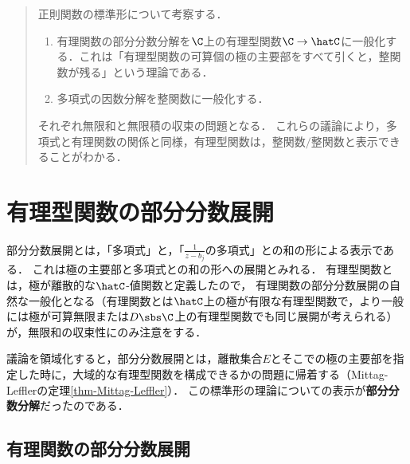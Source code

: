 \documentclass[uplatex, dvipdfmx]{jsreport}
\begin{document}
\begin{quotation}
    正則関数の標準形について考察する．
    \begin{enumerate}
        \item 有理関数の部分分数分解を$\C$上の有理型関数$\C\to\hatC$に一般化する．これは「有理型関数の可算個の極の主要部をすべて引くと，整関数が残る」という理論である．
        \item 多項式の因数分解を整関数に一般化する．
    \end{enumerate}
    それぞれ無限和と無限積の収束の問題となる．
    これらの議論により，多項式と有理関数の関係と同様，有理型関数は，整関数$/$整関数と表示できることがわかる．
\end{quotation}

\section{有理型関数の部分分数展開}

\begin{tcolorbox}[colframe=ForestGreen, colback=ForestGreen!10!white, breakable ,colbacktitle=ForestGreen!40!white, coltitle=black,fonttitle=\bfseries\sffamily,
    title=「極の主要部を取り除くと多項式が残る」理論]
    部分分数展開とは，「多項式」と，「$\frac{1}{z-b_j}$の多項式」との和の形による表示である．
    これは極の主要部と多項式との和の形への展開とみれる．
    有理型関数とは，極が離散的な$\hatC$-値関数と定義したので，
    有理関数の部分分数展開の自然な一般化となる（有理関数とは$\hatC$上の極が有限な有理型関数で，より一般には極が可算無限または$D\sbs\C$上の有理型関数でも同じ展開が考えられる）が，無限和の収束性にのみ注意をする．

    議論を領域化すると，部分分数展開とは，離散集合$E$とそこでの極の主要部を指定した時に，大域的な有理型関数を構成できるかの問題に帰着する（Mittag-Lefflerの定理\ref{thm-Mittag-Leffler}）．
    この標準形の理論についての表示が\textbf{部分分数分解}だったのである．
\end{tcolorbox}

\subsection{有理関数の部分分数展開}
\end{document}
